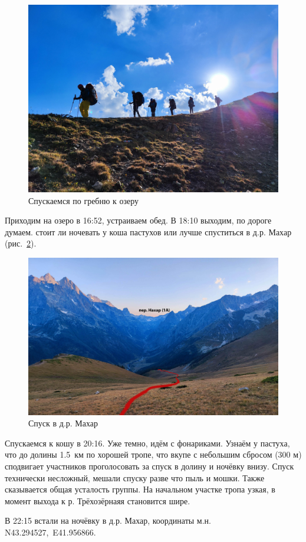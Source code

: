 \begin{figure}[h!]
	\centering
	\includegraphics[width=0.7\linewidth]{../pics/IMG_20240820_164917.jpg}
	\caption{Спускаемся по гребню к озеру}
	\label{fig:IMG_20240820_164917.jpg}
\end{figure}

Приходим на озеро в 16:52, устраиваем обед. В 18:10 выходим, по дороге думаем. стоит ли ночевать у коша пастухов или лучше спуститься в д.р. Махар (рис.~\ref{fig:IMG_20240820_184645.jpg}).

\begin{figure}[h!]
	\centering
	\includegraphics[width=0.7\linewidth]{../pics/IMG_20240820_184645.jpg}
	\caption{Спуск в д.р. Махар}
	\label{fig:IMG_20240820_184645.jpg}
\end{figure}

Спускаемся к кошу в 20:16. Уже темно, идём с фонариками. Узнаём у пастуха, что до долины 1.5~км по хорошей тропе, что вкупе с небольшим сбросом (300 м) сподвигает участников проголосовать за спуск в долину и ночёвку внизу. Спуск технически несложный, мешали спуску разве что пыль и мошки. Также сказывается общая усталость группы. На начальном участке тропа узкая, в момент выхода к р. Трёхозёрнаяя становится шире.

В 22:15 встали на ночёвку в д.р. Махар, координаты м.н. N43.294527\degree,~E41.956866\degree.


\clearpage

